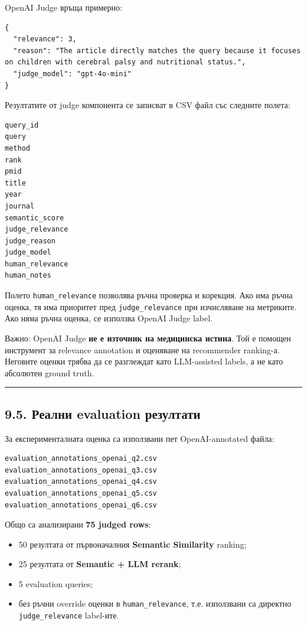 \documentclass[12pt,a4paper]{article}
\providecommand{\tightlist}{\setlength{\itemsep}{0pt}\setlength{\parskip}{0pt}}
\begin{document}
OpenAI Judge връща примерно:

\begin{verbatim}
{
  "relevance": 3,
  "reason": "The article directly matches the query because it focuses on children with cerebral palsy and nutritional status.",
  "judge_model": "gpt-4o-mini"
}
\end{verbatim}

Резултатите от judge компонента се записват в CSV файл със следните полета:

\begin{verbatim}
query_id
query
method
rank
pmid
title
year
journal
semantic_score
judge_relevance
judge_reason
judge_model
human_relevance
human_notes
\end{verbatim}

Полето \texttt{human\_relevance} позволява ръчна проверка и корекция. Ако има ръчна оценка, тя има приоритет пред \texttt{judge\_relevance} при изчисляване на метриките. Ако няма ръчна оценка, се използва OpenAI Judge label.

Важно: OpenAI Judge \textbf{не е източник на медицинска истина}. Той е помощен инструмент за relevance annotation и оценяване на recommender ranking-а. Неговите оценки трябва да се разглеждат като LLM-assisted labels, а не като абсолютен ground truth.

\vspace{0.5em}\hrule\vspace{1.0em}

\subsection{9.5. Реални evaluation резултати}\label{ux440ux435ux430ux43bux43dux438-evaluation-ux440ux435ux437ux443ux43bux442ux430ux442ux438}

За експерименталната оценка са използвани пет OpenAI-annotated файла:

\begin{verbatim}
evaluation_annotations_openai_q2.csv
evaluation_annotations_openai_q3.csv
evaluation_annotations_openai_q4.csv
evaluation_annotations_openai_q5.csv
evaluation_annotations_openai_q6.csv
\end{verbatim}

Общо са анализирани \textbf{75 judged rows}:

\begin{itemize}
\tightlist
\item
  50 резултата от първоначалния \textbf{Semantic Similarity} ranking;
\item
  25 резултата от \textbf{Semantic + LLM rerank};
\item
  5 evaluation queries;
\item
  без ръчни override оценки в \texttt{human\_relevance}, т.е. използвани са директно \texttt{judge\_relevance} label-ите.
\end{itemize}
\end{document}
